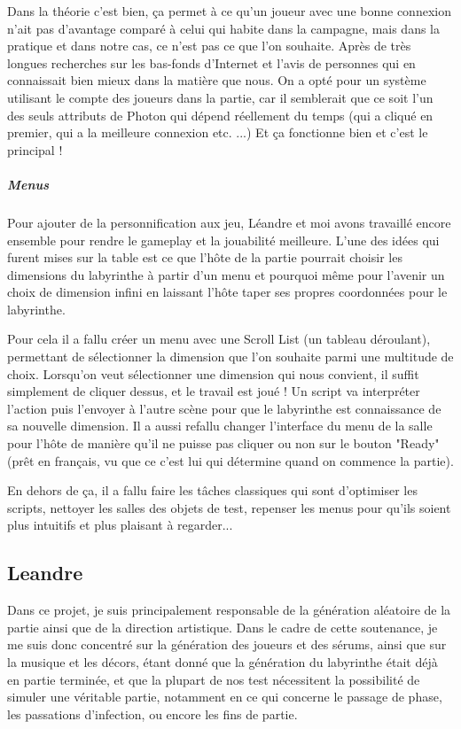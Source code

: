 \documentclass{article}
\begin{document}
Dans la théorie c'est bien, ça permet à ce qu'un joueur avec une bonne connexion n'ait pas d'avantage comparé à celui qui habite dans la campagne, mais dans la pratique et dans notre cas, ce n'est pas ce que l'on souhaite. Après de très longues recherches sur les bas-fonds d'Internet et l'avis de personnes qui en connaissait bien mieux dans la matière que nous. On a opté pour un système utilisant le compte des joueurs dans la partie, car il semblerait que ce soit l'un des seuls attributs de Photon qui dépend réellement du temps (qui a cliqué en premier, qui a la meilleure connexion etc. ...) Et ça fonctionne bien et c'est le principal !


\subparagraph{Menus}

Pour ajouter de la personnification aux jeu, Léandre et moi avons travaillé encore ensemble pour rendre le gameplay et la jouabilité meilleure. L'une des idées qui furent mises sur la table est ce que l'hôte de la partie pourrait choisir les dimensions du labyrinthe à partir d’un menu et pourquoi même pour l'avenir un choix de dimension infini en laissant l'hôte taper ses propres coordonnées pour le labyrinthe. 

Pour cela il a fallu créer un menu avec une Scroll List (un tableau déroulant), permettant de sélectionner la dimension que l'on souhaite parmi une multitude de choix. Lorsqu'on veut sélectionner une dimension qui nous convient, il suffit simplement de cliquer dessus, et le travail est joué ! Un script va interpréter l'action puis l'envoyer à l'autre scène pour que le labyrinthe est connaissance de sa nouvelle dimension. Il a aussi refallu changer l'interface du menu de la salle pour l'hôte de manière qu'il ne puisse pas cliquer ou non sur le bouton "Ready" (prêt en français, vu que ce c'est lui qui détermine quand on commence la partie).
 
En dehors de ça, il a fallu faire les tâches classiques qui sont d'optimiser les scripts, nettoyer les salles des objets de test, repenser les menus pour qu'ils soient plus intuitifs et plus plaisant à regarder...

\newpage
\subsection{Leandre}

Dans ce projet, je suis principalement responsable de la génération aléatoire de la partie ainsi que de la direction artistique. Dans le cadre de cette soutenance, je me suis donc concentré sur la génération des joueurs et des sérums, ainsi que sur la musique et les décors, étant donné que la génération du labyrinthe était déjà en partie terminée, et que la plupart de nos test nécessitent la possibilité de simuler une véritable partie, notamment en ce qui concerne le passage de phase, les passations d'infection, ou encore les fins de partie.
\end{document}
